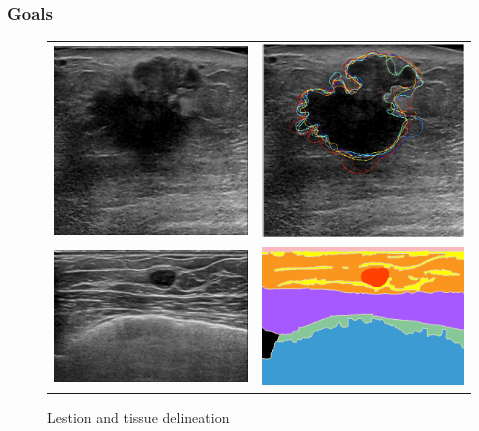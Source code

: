 
\graphicspath{{./content/breast/figures/}}

\begin{frame}\frametitle{Goals}
  \begin{figure}
  \begin{adjustbox}
    {max size={.95\textwidth}{.33\textheight},keepaspectratio=true}
    \begin{tabular}[t]{cc}
      \includegraphics[trim=30 130 50 20,clip,height=.40\textheight,width=.45\textwidth]{a110105_094.png} &
      \includegraphics[trim=20 75 30 10,clip,height=.40\textheight,width=.45\textwidth]{segment.png}\\
      \includegraphics[trim=50 60 15 0,clip,width=.45\textwidth]{000023.png} &
      \includegraphics[trim=50 60 15 0,clip,width=.45\textwidth]{000023_gt.png}
    \end{tabular}%
  \end{adjustbox}
  \caption{Lestion and tissue delineation}
\end{figure}
\end{frame}


